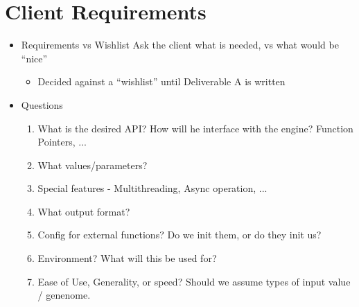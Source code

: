 \section{Client Requirements}
\begin{itemize}
\item{Requirements vs Wishlist}
 Ask the client what is needed, vs what would be ``nice''
 \begin{itemize}
 \item{Decided against a ``wishlist'' until Deliverable A is written}
 \end{itemize}
\item{Questions}
 \begin{enumerate}
 \item{What is the desired API?}
  How will he interface with the engine? Function Pointers, ...
 \item{What values/parameters?}
 \item{Special features - Multithreading, Async operation, ...}
 \item{What output format?}
 \item{Config for external functions? Do we init them, or do they init us?}
 \item{Environment? What will this be used for?}
 \item{Ease of Use, Generality, or speed?}
 Should we assume types of input value / genenome.
 \end{enumerate}
\end{itemize}




